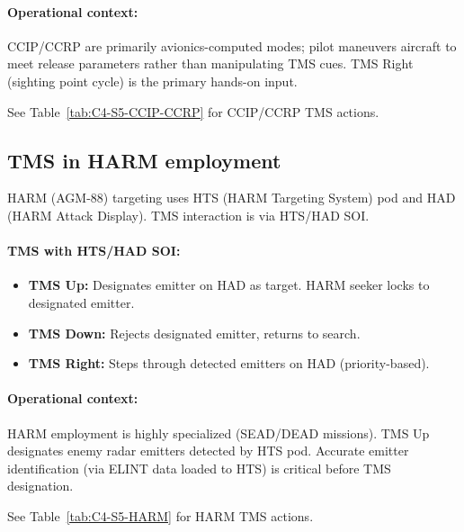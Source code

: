\documentclass[11pt, a4paper, twoside]{report}
\begin{document}
\paragraph{Operational context:}
CCIP/CCRP are primarily avionics-computed modes; pilot maneuvers aircraft to meet release parameters rather than manipulating TMS cues. TMS Right (sighting point cycle) is the primary hands-on input.

See Table~\ref{tab:C4-S5-CCIP-CCRP} for CCIP/CCRP TMS actions.

\subsection{TMS in HARM employment}
\label{sec:C4-S5-S5}

HARM (AGM-88) targeting uses HTS (HARM Targeting System) pod and HAD (HARM Attack Display). TMS interaction is via HTS/HAD SOI.

\paragraph{TMS with HTS/HAD SOI:}
\begin{itemize}
    \item \textbf{TMS Up:} Designates emitter on HAD as target. HARM seeker locks to designated emitter.
    \item \textbf{TMS Down:} Rejects designated emitter, returns to search.
    \item \textbf{TMS Right:} Steps through detected emitters on HAD (priority-based).
\end{itemize}

\paragraph{Operational context:}
HARM employment is highly specialized (SEAD/DEAD missions). TMS Up designates enemy radar emitters detected by HTS pod. Accurate emitter identification (via ELINT data loaded to HTS) is critical before TMS designation.

See Table~\ref{tab:C4-S5-HARM} for HARM TMS actions.

\end{document}
